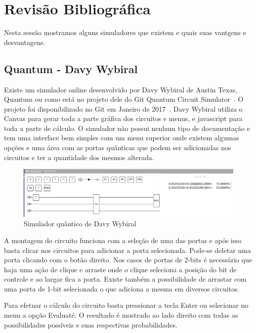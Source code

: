 \documentclass[a4paper, 12pt, oneside]{book}
\begin{document}
\section{Revisão Bibliográfica}

Nesta sessão mostramos alguns simuladores que existem e quais suas vantgens e desvantagens.

\subsection{Quantum - Davy Wybiral}

Existe um simulador online desenvolvido por Davy Wybiral de Austin Texas, Quantum ou como está no projeto dele do Git Quantum Circuit Simulator~\cite{davyw}. O projeto foi disponibilizado no Git em Janeiro de 2017~\cite{gitdavyw}. Davy Wybiral utiliza o Canvas para gerar toda a parte gráfica dos circuitos e menus, e javascript para toda a parte de cálculo. O simulador não possui nenhum tipo de documentação e tem uma interface bem simples com um menu superior onde existem algumas opções e uma área com as portas quânticas que podem ser adicionadas nos circuitos e ter a quantidade dos mesmos alterada.

\begin{figure}[hbtp]
\centering
\includegraphics[scale=0.36]{davyw.jpg}
\caption{Simulador quântico de Davy Wybiral}
\end{figure}

A montagem do circuito funciona com a seleção de uma das portas e após isso basta clicar nos circuitos para adicionar a porta selecionada. Pode-se deletar uma porta clicando com o botão direito. Nos casos de portas de 2-bits é necessário que haja uma ação de clique e arraste onde o clique seleciona a posição do bit de controle e ao largar fica a porta. Existe também a possibilidade de arrastar com uma porta de 1-bit selecionada o que adiciona a mesma em diversos circuitos.

Para efetuar o cálculo do circuito basta pressionar a tecla Enter ou selecionar no menu a opção Evaluaté. O resultado é mostrado ao lado direito com todas as possibilidades possíveis e suas respectivas probabilidades.
\end{document}
